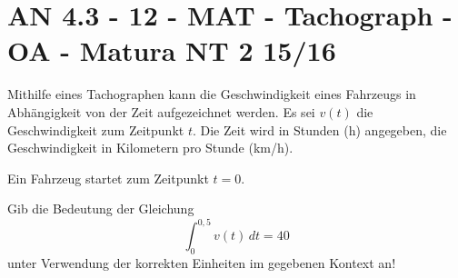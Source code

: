\section{AN 4.3 - 12 - MAT - Tachograph - OA - Matura NT 2 15/16}

\begin{beispiel}[AN 4.3]{1} %
Mithilfe eines Tachographen kann die Geschwindigkeit eines Fahrzeugs in Abhängigkeit von der Zeit aufgezeichnet werden. Es sei $v(t)$ die Geschwindigkeit zum Zeitpunkt $t$. Die Zeit wird in Stunden (h) angegeben, die Geschwindigkeit in Kilometern pro Stunde (km/h).

Ein Fahrzeug startet zum Zeitpunkt $t=0$.

Gib die Bedeutung der Gleichung $$\int^{0,5}_0{v(t)}\,dt=40$$ unter Verwendung der korrekten Einheiten im gegebenen Kontext an!\leer

\end{beispiel}